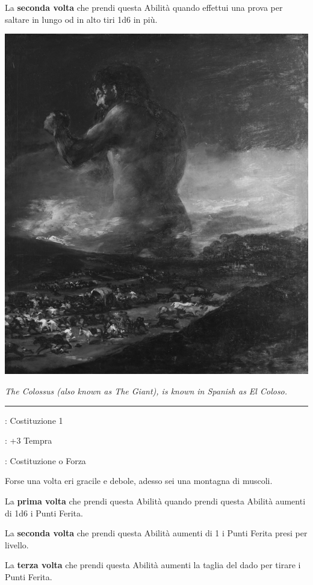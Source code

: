 \begin{multicols}{2}
La \textbf{seconda volta} che prendi questa Abilità quando effettui una prova per saltare in lungo od in alto tiri 1d6 in più.

\begin{center}
	\includegraphics[width=0.65\linewidth]{immagini/elcolosso.png}

	\emph{The Colossus (also known as The Giant), is known in Spanish as El Coloso.}
\end{center}

\smallskip\noindent\rule{\linewidth}{2pt} \hypertarget{Montagna umana}{}\medskip{}
\noindent
\begin{description}[noitemsep, topsep=0pt, parsep=0pt, partopsep=0pt, leftmargin=0cm, labelwidth=2.5cm]
    \item[\textbf{Requisito}]: Costituzione 1
    \item[\textbf{Tiri Salvezza}]: +3 Tempra
    \item[\textbf{Caratteristica}]: Costituzione o Forza
\end{description}

Forse una volta eri gracile e debole, adesso sei una montagna di muscoli.

La \textbf{prima volta} che prendi questa Abilità quando prendi questa Abilità aumenti di 1d6 i Punti Ferita.

La \textbf{seconda volta} che prendi questa Abilità aumenti di 1 i Punti Ferita presi per livello.

La \textbf{terza volta} che prendi questa Abilità aumenti la taglia del dado per tirare i Punti Ferita.


\end{multicols}
